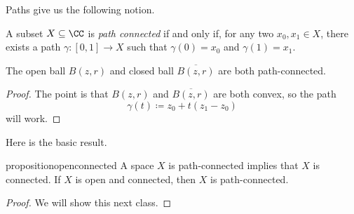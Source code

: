 \documentclass[../notes.tex]{subfiles}
\begin{document}
Paths give us the following notion.
\begin{definition}
	A subset $X\subseteq\CC$ is \textit{path connected} if and only if, for any two $x_0,x_1\in X$, there exists a path $\gamma\colon[0,1]\to X$ such that $\gamma(0)=x_0$ and $\gamma(1)=x_1$.
\end{definition}
\begin{lemma}
	The open ball $B(z,r)$ and closed ball $\overline{B(z,r)}$ are both path-connected.
\end{lemma}
\begin{proof}
	The point is that $B(z,r)$ and $\overline{B(z,r)}$ are both convex, so the path
	\[\gamma(t)\coloneqq z_0+t(z_1-z_0)\]
	will work.
\end{proof}
Here is the basic result.
\begin{restatable}{proposition}{openconnected} \label{prop:getpathconnected}
	A space $X$ is path-connected implies that $X$ is connected. If $X$ is open and connected, then $X$ is path-connected.
\end{restatable}
\begin{proof}
	We will show this next class.
\end{proof}
\end{document}
